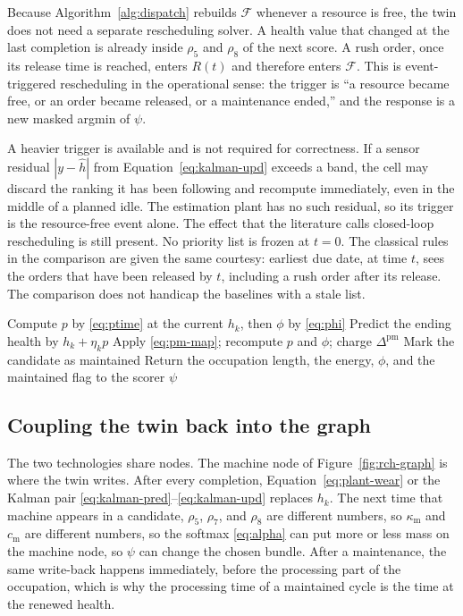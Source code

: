 Because Algorithm~\ref{alg:dispatch} rebuilds \(\mathcal{F}\) whenever a resource is free, the twin does not need a separate rescheduling solver. A health value that changed at the last completion is already inside \(\rho_5\) and \(\rho_8\) of the next score. A rush order, once its release time is reached, enters \(R(t)\) and therefore enters \(\mathcal{F}\). This is event-triggered rescheduling in the operational sense: the trigger is ``a resource became free, or an order became released, or a maintenance ended,'' and the response is a new masked argmin of \(\psi\).

A heavier trigger is available and is not required for correctness. If a sensor residual \(|y - \hat h|\) from Equation~\eqref{eq:kalman-upd} exceeds a band, the cell may discard the ranking it has been following and recompute immediately, even in the middle of a planned idle. The estimation plant has no such residual, so its trigger is the resource-free event alone. The effect that the literature calls closed-loop rescheduling is still present. No priority list is frozen at \(t = 0\). The classical rules in the comparison are given the same courtesy: earliest due date, at time \(t\), sees the orders that have been released by \(t\), including a rush order after its release. The comparison does not handicap the baselines with a stale list.

\begin{algorithm}[ht]
\caption{Chance-constrained maintenance test inside a candidate}
\label{alg:ssdt}
\begin{algorithmic}[1]
\State Compute \(p\) by \eqref{eq:ptime} at the current \(h_k\), then \(\phi\) by \eqref{eq:phi}
\State Predict the ending health by \(h_k + \eta_k p\)
  \State Apply \eqref{eq:pm-map}; recompute \(p\) and \(\phi\); charge \(\Delta^{\mathrm{pm}}\)
  \State Mark the candidate as maintained
\EndIf
\State Return the occupation length, the energy, \(\phi\), and the maintained flag to the scorer \(\psi\)
\end{algorithmic}
\end{algorithm}

\subsection{Coupling the twin back into the graph}

The two technologies share nodes. The machine node of Figure~\ref{fig:rch-graph} is where the twin writes. After every completion, Equation~\eqref{eq:plant-wear} or the Kalman pair \eqref{eq:kalman-pred}--\eqref{eq:kalman-upd} replaces \(h_k\). The next time that machine appears in a candidate, \(\rho_5\), \(\rho_7\), and \(\rho_8\) are different numbers, so \(\kappa_{\mathrm{m}}\) and \(c_{\mathrm{m}}\) are different numbers, so the softmax \eqref{eq:alpha} can put more or less mass on the machine node, so \(\psi\) can change the chosen bundle. After a maintenance, the same write-back happens immediately, before the processing part of the occupation, which is why the processing time of a maintained cycle is the time at the renewed health.

